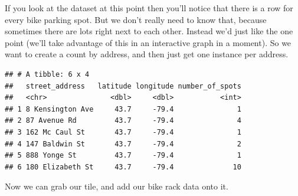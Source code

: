 \documentclass[
]{book}
\newenvironment{Shaded}{\begin{snugshade}}{\end{snugshade}}
\newcommand{\DataTypeTok}[1]{\textcolor[rgb]{0.13,0.29,0.53}{#1}}
\newcommand{\DecValTok}[1]{\textcolor[rgb]{0.00,0.00,0.81}{#1}}
\newcommand{\KeywordTok}[1]{\textcolor[rgb]{0.13,0.29,0.53}{\textbf{#1}}}
\newcommand{\NormalTok}[1]{#1}
\newcommand{\OperatorTok}[1]{\textcolor[rgb]{0.81,0.36,0.00}{\textbf{#1}}}
\newcommand{\StringTok}[1]{\textcolor[rgb]{0.31,0.60,0.02}{#1}}
\begin{document}
If you look at the dataset at this point then you'll notice that there is a row for every bike parking spot. But we don't really need to know that, because sometimes there are lots right next to each other. Instead we'd just like the one point (we'll take advantage of this in an interactive graph in a moment). So we want to create a count by address, and then just get one instance per address.

\begin{Shaded}
\end{Shaded}

\begin{verbatim}
## # A tibble: 6 x 4
##   street_address   latitude longitude number_of_spots
##   <chr>               <dbl>     <dbl>           <int>
## 1 8 Kensington Ave     43.7     -79.4               1
## 2 87 Avenue Rd         43.7     -79.4               4
## 3 162 Mc Caul St       43.7     -79.4               1
## 4 147 Baldwin St       43.7     -79.4               2
## 5 888 Yonge St         43.7     -79.4               1
## 6 180 Elizabeth St     43.7     -79.4              10
\end{verbatim}

Now we can grab our tile, and add our bike rack data onto it.
\end{document}
